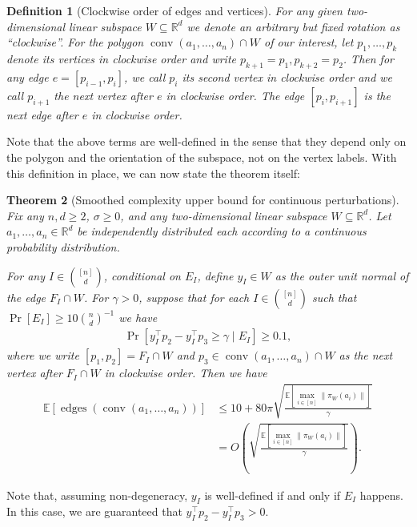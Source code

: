 \documentclass{article}\usepackage[a4paper,margin=20mm]{geometry}
\newtheorem{theorem}{Theorem}\newtheorem{lemma}[theorem]{Lemma}\newtheorem{proposition}[theorem]{Proposition}\newtheorem{corollary}[theorem]{Corollary}\newtheorem{definition}[theorem]{Definition}\newtheorem{claim}[theorem]{Claim}\newtheorem{remark}[theorem]{Remark}\newtheorem{observation}[theorem]{Observation}\newtheorem{conjecture}[theorem]{Conjecture}\newtheorem{example}[theorem]{Example}
\newcommand{\R}{\mathbb R}
\newcommand{\E}{\mathbb E}
\newcommand{\conv}{\operatorname{conv}}
\newcommand{\edges}{\operatorname{edges}}
\renewcommand{\subset}{\subseteq}
\begin{document}
\begin{definition}[Clockwise order of edges and vertices]
    For any given two-dimensional linear subspace $W \subset \R^d$
    we denote an arbitrary but fixed rotation as ``clockwise''.
    For the polygon $\conv(a_1, \ldots, a_n) \cap W$ of our interest, let $p_1,\dots,p_k$
    denote its vertices in clockwise order and write $p_{k+1}=p_1, p_{k+2}=p_2$.
    Then for any edge $e = [p_{i-1}, p_i]$,
    we call $p_i$ its second vertex in clockwise order and
    we call $p_{i+1}$ the next vertex after $e$ in clockwise order.
    The edge $[p_i, p_{i+1}]$ is the next edge after $e$ in clockwise order.
\end{definition}
Note that the above terms are well-defined in the sense that they depend only on the polygon and
the orientation of the subspace, not on the vertex labels.
With this definition in place, we can now state the theorem itself:
\begin{theorem}[Smoothed complexity upper bound for continuous perturbations]\label{thm:ub-general}
    Fix any $n,d \geq 2$, $\sigma \geq 0$, and any two-dimensional linear subspace $W \subseteq \R^d$. 
    Let $a_1, \ldots, a_n \in \R^d$ be independently distributed each according to a
    continuous probability distribution.
    
    For any $I \in \binom{[n]}{d}$, conditional on $E_I$, 
    define $y_I \in W$ as the outer unit normal of the edge $F_I \cap W$.
    For $\gamma > 0$,
    suppose that for each $I \in \binom{[n]}{d}$ such that $\Pr[E_I] \geq 10 \binom{n}{d}^{-1}$ we have
    \begin{align*}
        \Pr[y_I^\top p_2 - y_I^\top p_3 \geq \gamma \mid E_I] \geq 0.1 ,
    \end{align*}
    where we write $[p_1, p_2] = F_I \cap W$ and $p_3 \in \conv(a_1, \ldots, a_n)\cap W$ as
    the next vertex after $F_I \cap W$ in clockwise order.
    Then we have
    \begin{align*}
        \E\left[ \edges\left(\conv(a_1, \ldots, a_n) \right) \right] &\leq 10 + 80\pi \sqrt{\frac{\E[\max_{i\in [n]} \|\pi_W(a_i)\|]}{\gamma}} \\
        &= O\left(\sqrt{\frac{\E[\max_{i \in [n]} \|\pi_W(a_i)\|]}{\gamma}} \right).
    \end{align*}
\end{theorem}
Note that, assuming non-degeneracy, $y_I$ is well-defined if and only if $E_I$ happens.
In this case, we are guaranteed that $y_I^\top p_2 - y_I^\top p_3 > 0$.
\end{document}
